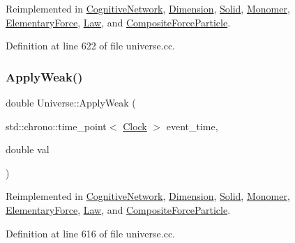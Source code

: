 Reimplemented in \mbox{\hyperlink{class_cognitive_network_a8b60fdb81d89a3a74d6c06cb29e7aad3}{Cognitive\+Network}}, \mbox{\hyperlink{class_dimension_a2ae0b6a8ee17f6e28b6d2d3209df4bf4}{Dimension}}, \mbox{\hyperlink{class_solid_a07534fa79bb8a6eb32e081e5158ba9e5}{Solid}}, \mbox{\hyperlink{class_monomer_a921f7add2d446b8670513220ace6c4b2}{Monomer}}, \mbox{\hyperlink{class_elementary_force_a185dc4e0b840505df27dbbed9fdcdc7b}{Elementary\+Force}}, \mbox{\hyperlink{class_law_a266f86cdcc01e813249a2f192ab85eb3}{Law}}, and \mbox{\hyperlink{class_composite_force_particle_ae0937405e68dd40b19036d5a359f7e07}{Composite\+Force\+Particle}}.



Definition at line 622 of file universe.\+cc.

\mbox{\label{class_universe_a6d1226b3adec3c42a833afdbb6a65a92}} 
\subsubsection{\texorpdfstring{Apply\+Weak()}{ApplyWeak()}}
{\footnotesize\ttfamily double Universe\+::\+Apply\+Weak (\begin{DoxyParamCaption}\item[{std\+::chrono\+::time\+\_\+point$<$ \mbox{\hyperlink{universe_8h_a0ef8d951d1ca5ab3cfaf7ab4c7a6fd80}{Clock}} $>$}]{event\+\_\+time,  }\item[{double}]{val }\end{DoxyParamCaption})\hspace{0.3cm}{\ttfamily [virtual]}}



Reimplemented in \mbox{\hyperlink{class_cognitive_network_a46a15b24bd61049fa1c4f635268086a1}{Cognitive\+Network}}, \mbox{\hyperlink{class_dimension_a72b8ab8d676b4df6b9a6ef948f5693c9}{Dimension}}, \mbox{\hyperlink{class_solid_a49e35bf258104b7bce225dc21058affb}{Solid}}, \mbox{\hyperlink{class_monomer_a176a1a4dfed1eaddc6637bbfd2660aba}{Monomer}}, \mbox{\hyperlink{class_elementary_force_aabf66a859e6e808a65c6929cd16f7597}{Elementary\+Force}}, \mbox{\hyperlink{class_law_a96ddd42403e3665c6070283ac201658d}{Law}}, and \mbox{\hyperlink{class_composite_force_particle_a1fd171a0c6fab0cbf9a45a0d24607bde}{Composite\+Force\+Particle}}.



Definition at line 616 of file universe.\+cc.

